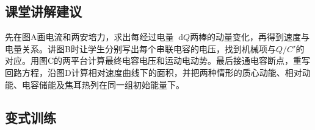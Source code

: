 \documentclass[UTF8,fontset=fandol,a4paper,11pt]{ctexart}
\newcommand{\dd}{\mathop{}\!\mathrm{d}}
\begin{document}


\subsection*{课堂讲解建议}

先在图A画电流和两安培力，求出每经过电量$\dd Q$两棒的动量变化，再得到速度与电量关系。讲图B时让学生分别写出每个串联电容的电压，找到机械项与$Q/C'$的对应。用图C的两平台计算最终电容电压和运动电动势。最后接通电容断点，重写回路方程，沿图D计算相对速度曲线下的面积，并把两种情形的质心动能、相对动能、电容储能及焦耳热列在同一组初始能量下。



\subsection*{变式训练}
\end{document}
